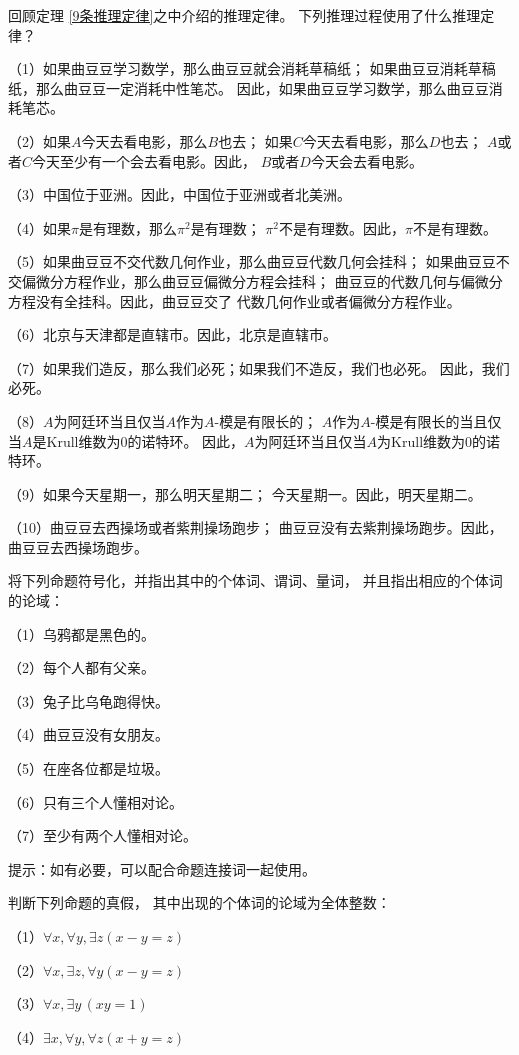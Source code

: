 \begin{prob}[推理定律的日常使用]回顾定理
\ref{9条推理定律}之中介绍的推理定律。
下列推理过程使用了什么推理定律？

（1）如果曲豆豆学习数学，那么曲豆豆就会消耗草稿纸；
如果曲豆豆消耗草稿纸，那么曲豆豆一定消耗中性笔芯。
因此，如果曲豆豆学习数学，那么曲豆豆消耗笔芯。

（2）如果$A$今天去看电影，那么$B$也去；
如果$C$今天去看电影，那么$D$也去；
$A$或者$C$今天至少有一个会去看电影。因此，
$B$或者$D$今天会去看电影。

（3）中国位于亚洲。因此，中国位于亚洲或者北美洲。

（4）如果$\pi$是有理数，那么$\pi^2$是有理数；
$\pi^2$不是有理数。因此，$\pi$不是有理数。

（5）如果曲豆豆不交代数几何作业，那么曲豆豆代数几何会挂科；
如果曲豆豆不交偏微分方程作业，那么曲豆豆偏微分方程会挂科；
曲豆豆的代数几何与偏微分方程没有全挂科。因此，曲豆豆交了
代数几何作业或者偏微分方程作业。

（6）北京与天津都是直辖市。因此，北京是直辖市。

（7）如果我们造反，那么我们必死；如果我们不造反，我们也必死。
因此，我们必死。

（8）$A$为阿廷环当且仅当$A$作为$A$-模是有限长的；
$A$作为$A$-模是有限长的当且仅当$A$是Krull维数为0的诺特环。
因此，$A$为阿廷环当且仅当$A$为Krull维数为0的诺特环。

（9）如果今天星期一，那么明天星期二；
今天星期一。因此，明天星期二。

（10）曲豆豆去西操场或者紫荆操场跑步；
曲豆豆没有去紫荆操场跑步。因此，曲豆豆去西操场跑步。
\end{prob}\vs

\begin{prob}[量词的使用]
将下列命题符号化，并指出其中的个体词、谓词、量词，
并且指出相应的个体词的论域：

（1）乌鸦都是黑色的。

（2）每个人都有父亲。

（3）兔子比乌龟跑得快。

（4）曲豆豆没有女朋友。

（5）在座各位都是垃圾。

（6）只有三个人懂相对论。

（7）至少有两个人懂相对论。
\end{prob}

提示：如有必要，可以配合命题连接词一起使用。\vs

\begin{prob}判断下列命题的真假，
其中出现的个体词的论域为全体整数：

（1）$\forall x,\forall y,\exists z(x-y=z)$

（2）$\forall x,\exists z,\forall y(x-y=z)$

（3）$\forall x,\exists y\,(xy=1)$

（4）$\exists x,\forall y,\forall z(x+y=z)$
\end{prob}

